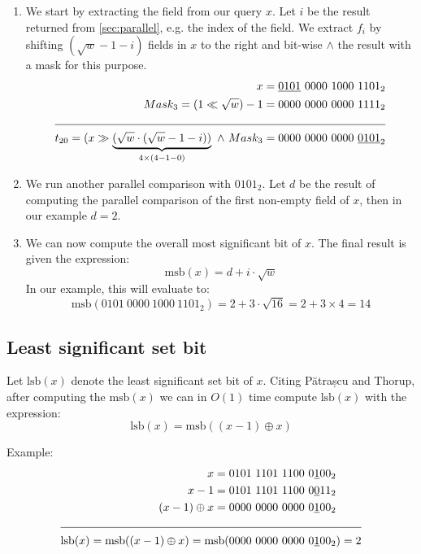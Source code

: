 \begin{enumerate}
    \item
    We start by extracting the field from our query $x$. Let $i$ be the result returned from \ref{sec:parallel}, e.g. the index of the field. We extract $f_i$ by shifting $(\sqrt{w} - 1 - i)$ fields in $x$ to the right and bit-wise $\wedge$ the result with a mask for this purpose.
    \begin{align*}
        x = \underline{0101}\ 0000\ 1000\ 1101_2 &\\
        Mask_3 = (1 \ll \sqrt{w}) - 1 = 0000\ 0000\ 0000\ 1111_2 &\\
        \cline{1-2}
        t_{20} = (x \gg \underbrace{(\sqrt{w} \cdot (\sqrt{w} - 1 - i))}_{4\times(4-1-0)}\ \wedge\ Mask_3 = 0000\ 0000\ 0000\ \underline{0101}_2 &
    \end{align*}
    \item
    We run another parallel comparison with $0101_2$. Let $d$ be the result of computing the parallel comparison of the first non-empty field of $x$, then in our example $d = 2$.
    \item
    We can now compute the overall most significant bit of $x$. The final result is given the expression:
    \begin{equation*}
        \text{msb}(x) = d + i\cdot\sqrt{w}
    \end{equation*}
    In our example, this will evaluate to:
    \begin{equation*}
        \text{msb}(0101\ 0000\ 1000\ 1101_2) = 2 + 3\cdot\sqrt{16} = 2 + 3 \times 4 = 14
    \end{equation*}
\end{enumerate}

\subsection{Least significant set bit} \label{sec:lsbAlgorithm}

Let $\text{lsb}(x)$ denote the least significant set bit of $x$. Citing Pătrașcu and Thorup, after computing the $\text{msb}(x)$ we can in $O(1)$ time compute $\text{lsb}(x)$ with the expression:
\begin{equation*}
    \text{lsb}(x) = \text{msb}((x - 1) \oplus x)
\end{equation*}

Example:
\begin{align*}
    x = 0101\ 1101\ 1100\ 0\underline{1}00_2& \\
    x - 1 = 0101\ 1101\ 1100\ 0\underline{0}11_2& \\
    (x - 1) \oplus x = 0000\ 0000\ 0000\ 0\underline{1}00_2& \\
    \cline{1-2}
    \text{lsb}(x) = \text{msb}((x - 1) \oplus x) = \text{msb}(0000\ 0000\ 0000\ 0\underline{1}00_2&) = 2
\end{align*}

